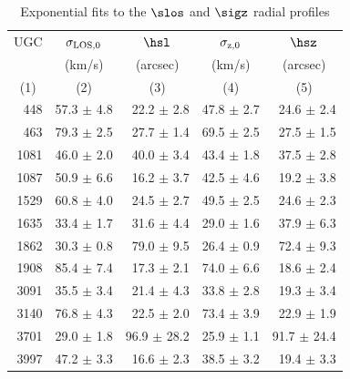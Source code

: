 \begin{table}
\caption{\label{tab:expsig}
Exponential fits to the $\slos$ and $\sigz$ radial profiles}
\centering
%
{\small
\begin{tabular}{|r r r r r|}
\hline
\multicolumn{1}{|c}{UGC}                 & 
\multicolumn{1}{c}{$\sigma_{\rm LOS,0}$} &
\multicolumn{1}{c}{$\hsl$}               &
\multicolumn{1}{c}{$\sigma_{\rm z,0}$}   &
\multicolumn{1}{c|}{$\hsz$}              \\
%
\multicolumn{1}{|c}{}                    & 
\multicolumn{1}{c}{(km/s)}                 &
\multicolumn{1}{c}{(arcsec)}               &
\multicolumn{1}{c}{(km/s)}                 &
\multicolumn{1}{c|}{(arcsec)}              \\
%
\multicolumn{1}{|c}{(1)}             &   
\multicolumn{1}{c}{(2)}              & 
\multicolumn{1}{c}{(3)}              & 
\multicolumn{1}{c}{(4)}              & 
\multicolumn{1}{c|}{(5)}            \\
%
\hline
  448 &  57.3 $\pm$   4.8 & 22.2 $\pm$  2.8 &    47.8 $\pm$  2.7 & 24.6 $\pm$  2.4  \\
  463 &  79.3 $\pm$   2.5 & 27.7 $\pm$  1.4 &    69.5 $\pm$  2.5 & 27.5 $\pm$  1.5  \\
 1081 &  46.0 $\pm$   2.0 & 40.0 $\pm$  3.4 &    43.4 $\pm$  1.8 & 37.5 $\pm$  2.8  \\
 1087 &  50.9 $\pm$   6.6 & 16.2 $\pm$  3.7 &    42.5 $\pm$  4.6 & 19.2 $\pm$  3.8  \\
 1529 &  60.8 $\pm$   4.0 & 24.5 $\pm$  2.7 &    49.5 $\pm$  2.5 & 24.6 $\pm$  2.3  \\
 1635 &  33.4 $\pm$   1.7 & 31.6 $\pm$  4.4 &    29.0 $\pm$  1.6 & 37.9 $\pm$  6.3  \\
 1862 &  30.3 $\pm$   0.8 & 79.0 $\pm$  9.5 &    26.4 $\pm$  0.9 & 72.4 $\pm$  9.3  \\
 1908 &  85.4 $\pm$   7.4 & 17.3 $\pm$  2.1 &    74.0 $\pm$  6.6 & 18.6 $\pm$  2.4  \\
 3091 &  35.5 $\pm$   3.4 & 21.4 $\pm$  4.3 &    33.8 $\pm$  2.8 & 19.3 $\pm$  3.4  \\
 3140 &  76.8 $\pm$   4.3 & 22.5 $\pm$  2.0 &    73.4 $\pm$  3.9 & 22.9 $\pm$  1.9  \\
 3701 &  29.0 $\pm$   1.8 & 96.9 $\pm$ 28.2 &    25.9 $\pm$  1.1 & 91.7 $\pm$ 24.4  \\
 3997 &  47.2 $\pm$   3.3 & 16.6 $\pm$  2.3 &    38.5 $\pm$  3.2 & 19.4 $\pm$  3.3  \\

\end{tabular}}
\end{table}
